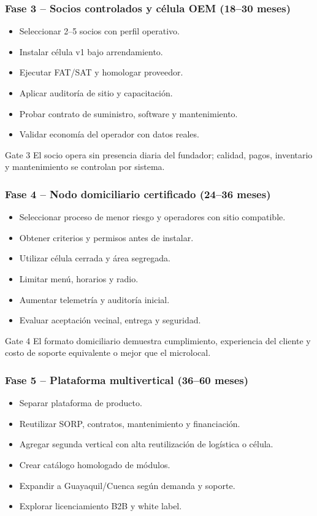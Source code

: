 \documentclass[11pt,a4paper]{article}
\begin{document}
\subsubsection*{Fase 3 -- Socios controlados y célula OEM (18--30 meses)}
\begin{itemize}
\item Seleccionar 2--5 socios con perfil operativo.
\item Instalar célula v1 bajo arrendamiento.
\item Ejecutar FAT/SAT y homologar proveedor.
\item Aplicar auditoría de sitio y capacitación.
\item Probar contrato de suministro, software y mantenimiento.
\item Validar economía del operador con datos reales.
\end{itemize}
\begin{caja}{Gate 3}
El socio opera sin presencia diaria del fundador; calidad, pagos, inventario y mantenimiento se controlan
por sistema.
\end{caja}

\subsubsection*{Fase 4 -- Nodo domiciliario certificado (24--36 meses)}
\begin{itemize}
\item Seleccionar proceso de menor riesgo y operadores con sitio compatible.
\item Obtener criterios y permisos antes de instalar.
\item Utilizar célula cerrada y área segregada.
\item Limitar menú, horarios y radio.
\item Aumentar telemetría y auditoría inicial.
\item Evaluar aceptación vecinal, entrega y seguridad.
\end{itemize}
\begin{caja}{Gate 4}
El formato domiciliario demuestra cumplimiento, experiencia del cliente y costo de soporte equivalente o
mejor que el microlocal.
\end{caja}

\subsubsection*{Fase 5 -- Plataforma multivertical (36--60 meses)}
\begin{itemize}
\item Separar plataforma de producto.
\item Reutilizar SORP, contratos, mantenimiento y financiación.
\item Agregar segunda vertical con alta reutilización de logística o célula.
\item Crear catálogo homologado de módulos.
\item Expandir a Guayaquil/Cuenca según demanda y soporte.
\item Explorar licenciamiento B2B y white label.
\end{itemize}
\end{document}
